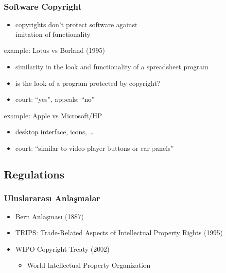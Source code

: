 \documentclass[dvipsnames]{beamer}
\theoremstyle{definition}
\theoremstyle{example}
\theoremstyle{plain}
\begin{document}
\begin{frame}
  \frametitle{Software Copyright}

  \begin{itemize}
    \item copyrights don't protect software against\\
      imitation of functionality
  \end{itemize}

  \begin{exampleblock}{example: Lotus vs Borland (1995)}
    \begin{itemize}
      \item similarity in the look and functionality of a spreadsheet program
      \item is the look of a program protected by copyright?
      \item court: ``yes'', appeals: ``no''
    \end{itemize}
  \end{exampleblock}

  \pause
  \begin{exampleblock}{example: Apple vs Microsoft/HP}
    \begin{itemize}
      \item desktop interface, icons, \ldots
      \item court: ``similar to video player buttons or car panels''
    \end{itemize}
  \end{exampleblock}
\end{frame}

\subsection{Regulations}

\begin{frame}
  \frametitle{Uluslararası Anlaşmalar}

  \begin{itemize}
    \item Bern Anlaşması (1887)
    \item TRIPS: Trade-Related Aspects of Intellectual Property Rights (1995)
    \item WIPO Copyright Treaty (2002)
    \begin{itemize}
      \item World Intellectual Property Organization
    \end{itemize}
  \end{itemize}
\end{frame}
\end{document}
